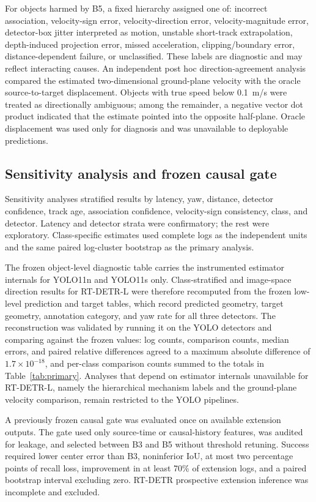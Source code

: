 \documentclass[journal]{IEEEtran}
\begin{document}
For objects harmed by B5, a fixed hierarchy assigned one of: incorrect association, velocity-sign error, velocity-direction error, velocity-magnitude error, detector-box jitter interpreted as motion, unstable short-track extrapolation, depth-induced projection error, missed acceleration, clipping/boundary error, distance-dependent failure, or unclassified. These labels are diagnostic and may reflect interacting causes. An independent post hoc direction-agreement analysis compared the estimated two-dimensional ground-plane velocity with the oracle source-to-target displacement. Objects with true speed below 0.1~m/s were treated as directionally ambiguous; among the remainder, a negative vector dot product indicated that the estimate pointed into the opposite half-plane. Oracle displacement was used only for diagnosis and was unavailable to deployable predictions.

\subsection{Sensitivity analysis and frozen causal gate}
Sensitivity analyses stratified results by latency, yaw, distance, detector confidence, track age, association confidence, velocity-sign consistency, class, and detector. Latency and detector strata were confirmatory; the rest were exploratory. Class-specific estimates used complete logs as the independent units and the same paired log-cluster bootstrap as the primary analysis.

The frozen object-level diagnostic table carries the instrumented estimator internals for YOLO11n and YOLO11s only. Class-stratified and image-space direction results for RT-DETR-L were therefore recomputed from the frozen low-level prediction and target tables, which record predicted geometry, target geometry, annotation category, and yaw rate for all three detectors. The reconstruction was validated by running it on the YOLO detectors and comparing against the frozen values: log counts, comparison counts, median errors, and paired relative differences agreed to a maximum absolute difference of $1.7\times10^{-18}$, and per-class comparison counts summed to the totals in Table~\ref{tab:primary}. Analyses that depend on estimator internals unavailable for RT-DETR-L, namely the hierarchical mechanism labels and the ground-plane velocity comparison, remain restricted to the YOLO pipelines.

A previously frozen causal gate was evaluated once on available extension outputs. The gate used only source-time or causal-history features, was audited for leakage, and selected between B3 and B5 without threshold retuning. Success required lower center error than B3, noninferior IoU, at most two percentage points of recall loss, improvement in at least 70\% of extension logs, and a paired bootstrap interval excluding zero. RT-DETR prospective extension inference was incomplete and excluded.
\end{document}
